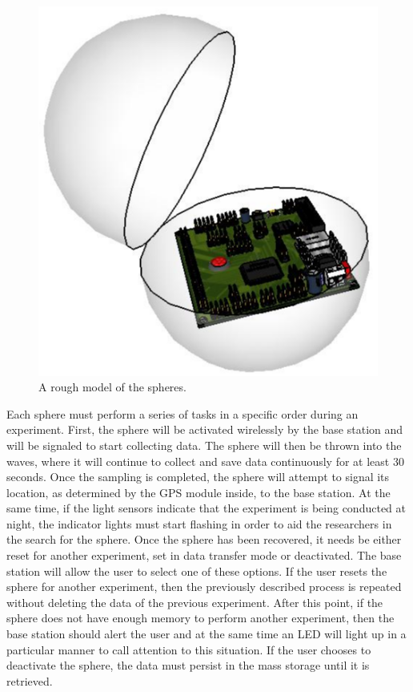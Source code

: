 \begin{figure}[H]
	\centering
	\includegraphics[scale=0.6]{img/Sphere_001.png}
	\caption{A rough model of the spheres. \label{fig:sphereMockup}}
\end{figure}

Each sphere must perform a series of tasks in a specific order during an experiment.  First, the sphere will be activated wirelessly by the base station and will be signaled to start collecting data.  The sphere will then be thrown into the waves, where it will continue to collect and save data continuously for at least 30 seconds. Once the sampling is completed, the sphere will attempt to signal its location, as determined by the GPS module inside, to the base station.  At the same time, if the light sensors indicate that the experiment is being conducted at night, the indicator lights must start flashing in order to aid the researchers in the search for the sphere.  Once the sphere has been recovered, it needs be either reset for another experiment, set in data transfer mode or deactivated.  The base station will allow the user to select one of these options.  If the user resets the sphere for another experiment, then the previously described process is repeated without deleting the data of the previous experiment.  After this point, if the sphere does not have enough memory to perform another experiment, then the base station should alert the user and at the same time an LED will light up in a particular manner to call attention to this situation. If the user chooses to deactivate the sphere, the data must persist in the mass storage until it is retrieved.

